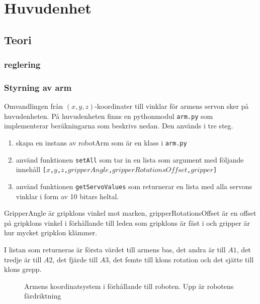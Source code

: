 
\section{Huvudenhet}

\subsection{Teori}

\subsubsection{reglering}

\subsubsection{Styrning av arm}
Omvandlingen från $(x,y,z)$-koordinater till vinklar för armens servon sker på huvudenheten. På huvudenheten finns en pythonmodul \texttt{arm.py} som implementerar beräkningarna som beskrivs nedan. Den används i tre steg.
\begin{enumerate}
    \item skapa en instans av robotArm som är en klass i \texttt{arm.py}
    \item använd funktionen \texttt{setAll} som tar in en lista som argument med följande innehåll \newline \texttt{[$x$,$y$,$z$,$gripperAngle$,$gripperRotationsOffset$,$gripper$]} 
    \item använd funktionen \texttt{getServoValues} som returnerar en lista med alla servons vinklar i form av 10 bitars heltal.
\end{enumerate}

GripperAngle är gripklons vinkel mot marken, gripperRotationsOffset är en offset på gripklons vinkel i förhållande till leden som gripklons är fäst i och gripper är hur mycket gripklon klämmer.

I listan som returneras är första värdet till armens bas, det andra är till $A1$, det tredje är till $A2$, det fjärde till $A3$, det femte till klons rotation och det sjätte till klons grepp.

\begin{figure}[h!]
    \centerline{}
    \caption{Armens koordinatsystem i förhållande till roboten. Upp är robotens färdriktning}
\end{figure}

